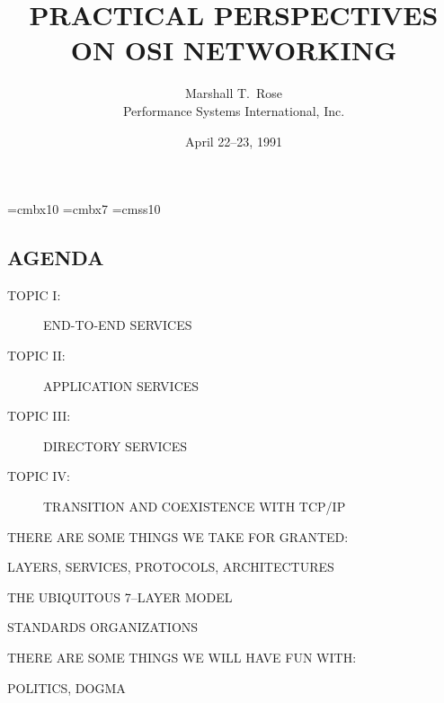 

\def\emph#1{\underline{#1}}
\def\X/{$\surd$}

\font\xx=cmbx10
\font\yy=cmbx7
\font\sf=cmss10

\raggedright


\let\tradeNAMfont=\relax
\let\tradeORGfont=\relax





\title	{PRACTICAL PERSPECTIVES\\ ON OSI NETWORKING}
\author	{Marshall T.~Rose\\ Performance Systems International, Inc.}
\date	{April 22--23, 1991}
\maketitlepage


\begin{bwslide}\thispagestyle{empty}
\part*	{AGENDA}\bf

\begin{description}
\item[TOPIC I:]		END-TO-END SERVICES

\item[TOPIC II:]	APPLICATION SERVICES

\item[TOPIC III:]	DIRECTORY SERVICES

\item[TOPIC IV:]	TRANSITION AND COEXISTENCE WITH TCP/IP
\end{description}
\end{bwslide}

\setcounter{slide}{0}

\begin{bwslide}

\begin{nrtc}
\item	THERE ARE SOME THINGS WE TAKE FOR GRANTED:
    \begin{nrtc}
    \item	LAYERS, SERVICES, PROTOCOLS, ARCHITECTURES

    \item	THE UBIQUITOUS 7--LAYER MODEL

    \item	STANDARDS ORGANIZATIONS
    \end{nrtc}

\item	THERE ARE SOME THINGS WE WILL HAVE FUN WITH:
    \begin{nrtc}
    \item	POLITICS, DOGMA
    \end{nrtc}
\end{nrtc}
\end{bwslide}












